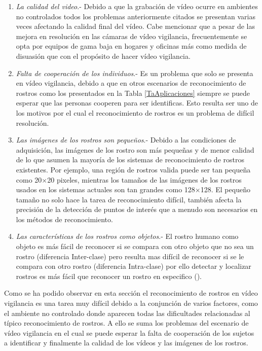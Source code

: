 \begin{enumerate}
\item \textit{La calidad del video}.- Debido a que la grabación de vídeo ocurre en ambientes no controlados todos los problemas anteriormente citados se presentan varias veces afectando la calidad final del vídeo. Cabe mencionar que a pesar de las mejora en resolución en las cámaras de vídeo vigilancia, frecuentemente se opta por equipos de gama baja en hogares y oficinas más como medida de disuasión que con el propósito de hacer vídeo vigilancia.
\item \textit{Falta de cooperación de los individuos}.- Es un problema que solo se presenta en vídeo vigilancia, debido a que en otros escenarios de reconocimiento de rostros como los presentados en la Tabla \ref{TaAplicaciones} siempre se puede esperar que las personas cooperen para ser identificas. Esto resulta ser uno de los motivos por el cual el reconocimiento de rostros es un problema de difícil resolución.
\item \textit{Las imágenes de los  rostros son pequeños}.- Debido a las condiciones de adquisición, las imágenes de los rostro son más pequeñas y de menor calidad de lo que asumen la mayoría de los sistemas de reconocimiento de rostros existentes. Por ejemplo, una región de rostros valida puede ser tan pequeña como 20$\times$20 pixeles, mientras los tamaños de las imágenes de los rostros usados en los sistemas actuales son tan grandes como 128$\times$128. El pequeño tamaño no solo hace la tarea de reconocimiento difícil, también afecta la precisión de la detección de puntos de interés que a menudo son necesarios en los métodos de reconocimiento.
\item \textit{Las características de los rostros como objetos}.- El rostro humano como objeto es más fácil de reconocer si se compara con otro objeto que no sea un rostro (diferencia Inter-clase) pero resulta mas difícil de reconocer si se le compara con otro rostro (diferencia Intra-clase) por ello detectar y localizar rostros es más fácil que reconocer un rostro en especifico (\cite{zhao2003face}). 
\end{enumerate}

Como se ha podido observar en esta sección el reconocimiento de rostros en vídeo vigilancia es una tarea muy difícil debido a la conjunción de varios factores, como el ambiente no controlado donde aparecen todas las dificultades relacionadas al típico reconocimiento de rostros. A ello se suma los problemas del escenario de vídeo vigilancia en el cual se puede esperar la falta de cooperación de los sujetos a identificar y finalmente la calidad de los vídeos y las imágenes de los rostros.

